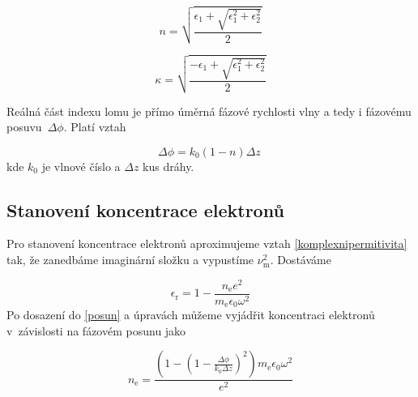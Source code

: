 \documentclass[a4paper,12pt]{article}
\begin{document}
\begin{equation}
	n = \sqrt{\frac{\epsilon_1 + \sqrt{\epsilon_1^2 + \epsilon_2^2}}{2}}
	\label{realna}
\end{equation}

\begin{equation}
	\kappa = \sqrt{\frac{-\epsilon_1 + \sqrt{\epsilon_1^2 + \epsilon_2^2}}{2}}
	\label{imaginarni}
\end{equation}

Reálná část indexu lomu je
přímo úměrná fázové rychlosti vlny a tedy i fázovému posuvu~$\Delta\phi$. Platí vztah

\begin{equation}
 	\Delta\phi = k_0(1-n) \Delta
z~\label{posun}
\end{equation}
kde $k_0$ je vlnové číslo a $\Delta z$ kus dráhy.  

\subsection{Stanovení koncentrace elektronů}
Pro stanovení koncentrace elektronů aproximujeme vztah 
\eqref{komplexnipermitivita} tak, že zanedbáme imaginární složku a vypustíme 
$\nu_\text{m}^2$. Dostáváme

\begin{equation}
	\epsilon_\text{r} = 1- \frac{n_\text{e} e^2}{m_\text{e} \epsilon_0 \omega^2}
	\label{permitivita}
\end{equation}
Po dosazení do \eqref{posun} a úpravách můžeme vyjádřit koncentraci elektronů
v~závislosti na fázovém posunu jako

\begin{equation}
	n_\text{e} = \frac{\left(1-\left(1-\frac{\Delta\phi}{k_0 \Delta z} 
	\right)^2\right)
	m_\text{e} \epsilon_0 \omega^2}{e^2}
\label{eq:koncentrace}
\end{equation}

\end{document}
